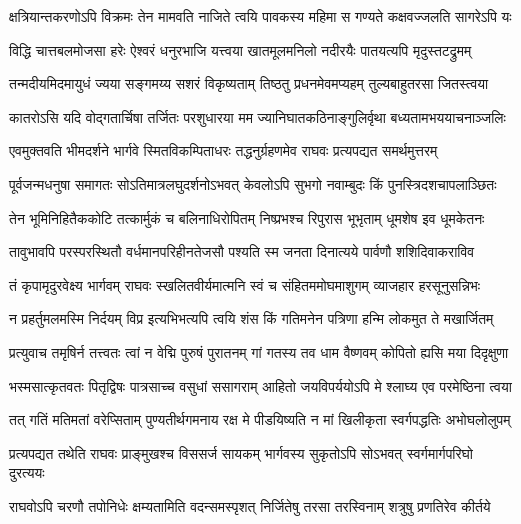 \fourlineindentedshloka
{क्षत्रियान्तकरणोऽपि विक्रमः}
{तेन मामवति नाजिते त्वयि}
{पावकस्य महिमा स गण्यते}
{कक्षवज्जलति सागरेऽपि यः} %

\fourlineindentedshloka
{विद्धि चात्तबलमोजसा हरेः}
{ऐश्वरं धनुरभाजि यत्त्वया}
{खातमूलमनिलो नदीरयैः}
{पातयत्यपि मृदुस्तटद्रुमम्} %

\fourlineindentedshloka
{तन्मदीयमिदमायुधं ज्यया}
{सङ्गमय्य सशरं विकृष्यताम्}
{तिष्ठतु प्रधनमेवमप्यहम्}
{तुल्यबाहुतरसा जितस्त्वया} %

\fourlineindentedshloka
{कातरोऽसि यदि वोद्गतार्चिषा}
{तर्जितः परशुधारया मम}
{ज्यानिघातकठिनाङ्गुलिर्वृथा}
{बध्यतामभययाचनाञ्जलिः} %

\fourlineindentedshloka
{एवमुक्तवति भीमदर्शने}
{भार्गवे स्मितविकम्पिताधरः}
{तद्धनुर्ग्रहणमेव राघवः}
{प्रत्यपद्यत समर्थमुत्तरम्} %

\fourlineindentedshloka
{पूर्वजन्मधनुषा समागतः}
{सोऽतिमात्रलघुदर्शनोऽभवत्}
{केवलोऽपि सुभगो नवाम्बुदः}
{किं पुनस्त्रिदशचापलाञ्छितः} %

\fourlineindentedshloka
{तेन भूमिनिहितैककोटि}
{तत्कार्मुकं च बलिनाधिरोपितम्}
{निष्प्रभश्च रिपुरास भूभृताम्}
{धूमशेष इव धूमकेतनः} %

\fourlineindentedshloka
{तावुभावपि परस्परस्थितौ}
{वर्धमानपरिहीनतेजसौ}
{पश्यति स्म जनता दिनात्यये}
{पार्वणौ शशिदिवाकराविव} %

\fourlineindentedshloka
{तं कृपामृदुरवेक्ष्य भार्गवम्}
{राघवः स्खलितवीर्यमात्मनि}
{स्वं च संहितममोघमाशुगम्}
{व्याजहार हरसूनुसन्निभः} %

\fourlineindentedshloka
{न प्रहर्तुमलमस्मि निर्दयम्}
{विप्र इत्यभिभत्यपि त्वयि}
{शंस किं गतिमनेन पत्रिणा}
{हन्मि लोकमुत ते मखार्जितम्} %

\fourlineindentedshloka
{प्रत्युवाच तमृषिर्न तत्त्वतः}
{त्वां न वेद्मि पुरुषं पुरातनम्}
{गां गतस्य तव धाम वैष्णवम्}
{कोपितो ह्यसि मया दिदृक्षुणा} %

\fourlineindentedshloka
{भस्मसात्कृतवतः पितृद्विषः}
{पात्रसाच्च वसुधां ससागराम्}
{आहितो जयविपर्ययोऽपि मे}
{श्लाघ्य एव परमेष्ठिना त्वया} %

\fourlineindentedshloka
{तत् गतिं मतिमतां वरेप्सिताम्}
{पुण्यतीर्थगमनाय रक्ष मे}
{पीडयिष्यति न मां खिलीकृता}
{स्वर्गपद्धतिः अभोघलोलुपम्} %

\fourlineindentedshloka
{प्रत्यपद्यत तथेति राघवः}
{प्राङ्मुखश्च विससर्ज सायकम्}
{भार्गवस्य सुकृतोऽपि सोऽभवत्}
{स्वर्गमार्गपरिघो दुरत्ययः} %

\fourlineindentedshloka
{राघवोऽपि चरणौ तपोनिधेः}
{क्षम्यतामिति वदन्समस्पृशत्}
{निर्जितेषु तरसा तरस्विनाम्}
{शत्रुषु प्रणतिरेव कीर्तये} %

